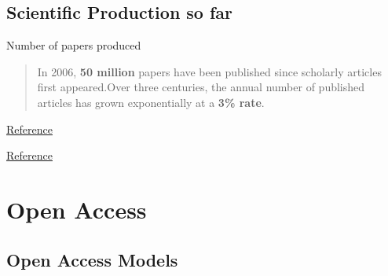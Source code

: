 \documentclass[10pt,compress,serif,aspectratio=169]{beamer}
\begin{document}


\subsection{Scientific Production so far}
   \begin{frame}[t]{Number of papers produced}

 \begin{quote}
 In 2006, \textbf{50 million} papers have been published since scholarly articles first appeared.\newline Over three centuries, the annual number of published articles has grown exponentially at a \textbf{3\% rate}.
 \end{quote}
 \pause

 \begin{minipage}{.49\textwidth}
   \href{toto}{Reference}
\end{minipage}
 \begin{minipage}{.49\textwidth}
   \href{toto}{Reference}
\end{minipage}
\end{frame}



\section{Open Access}
\subsection{Open Access Models}
\end{document}
